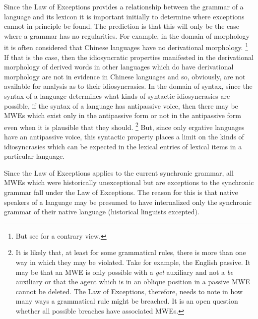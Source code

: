 \documentclass[output=paper]{langsci/langscibook}
\begin{document}
\largerpage
Since the Law of Exceptions  provides a relationship between the grammar of 
a language and its lexicon it is important initially to determine where 
exceptions cannot in principle be found. The prediction is that this will 
only be the case where a grammar has no regularities. For example, in the 
domain of morphology it is often considered that Chinese languages  have no 
derivational morphology.%
\footnote{But see \citet{Starosta1997} for a contrary view.} If that is 
the case, then the idiosyncratic properties manifested in the derivational 
morphology of derived words in other languages which do have derivational 
morphology are not in evidence in  Chinese languages and so, obviously, are 
not available for analysis as to their idiosyncrasies. 
In the domain of 
syntax, since the syntax of a language determines what kinds of syntactic 
idiosyncrasies are possible, if the syntax of a language has  antipassive 
voice, then there may be MWEs which exist only in the antipassive form or 
not in the antipassive form even when it is plausible that they 
should.%
\footnote{It is likely that, at least for some grammatical rules, there 
is more than one way in which they may be violated. Take for example, the 
English  passive. It may be that an MWE is only possible with a 
\textit{get} auxiliary and not a \textit{be} auxiliary or that the agent 
which is in an oblique position in a passive MWE cannot be deleted. The 
Law of Exceptions, therefore, needs to note in how many ways a grammatical 
rule might be breached. It is an open question whether all possible 
breaches have associated MWEs.} But, since only ergative languages have an 
antipassive voice, this syntactic property places a limit on the kinds of 
idiosyncrasies which can be expected in the lexical entries of lexical 
items in a particular language. 

Since the Law of Exceptions applies to the current synchronic grammar, all 
MWEs which were historically unexceptional but are exceptions to the 
synchron\-ic grammar fall under the Law of Exceptions. The reason for this 
is that native speakers of a language may be presumed to have internalized 
only the synchronic grammar of their native language (historical linguists 
excepted). 
\end{document}
